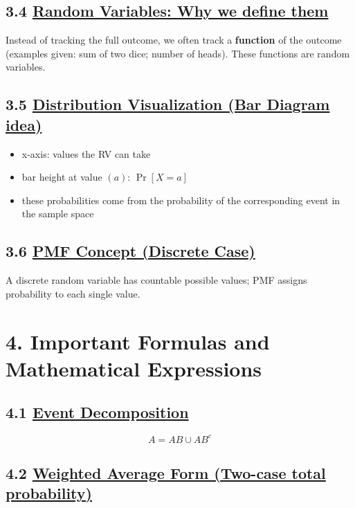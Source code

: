 \documentclass[11pt]{article}
\begin{document}
\vspace{0.5cm}
\subsection*{3.4 \underline{Random Variables: Why we define them}}

Instead of tracking the full outcome, we often track a \textbf{function} of the outcome (examples given: sum of two dice; number of heads). These functions are random variables.

\vspace{0.5cm}
\subsection*{3.5 \underline{Distribution Visualization (Bar Diagram idea)}}

\begin{itemize}
\item x-axis: values the RV can take
\item bar height at value $(a)$: $\Pr[X=a]$
\item these probabilities come from the probability of the corresponding event in the sample space
\end{itemize}

\vspace{0.5cm}
\subsection*{3.6 \underline{PMF Concept (Discrete Case)}}

A discrete random variable has countable possible values; PMF assigns probability to each single value.

\vspace{1cm}
\section*{4. Important Formulas and Mathematical Expressions}

\vspace{0.5cm}
\subsection*{4.1 \underline{Event Decomposition}}

\[
A = AB \cup AB^c
\]

\vspace{0.5cm}
\subsection*{4.2 \underline{Weighted Average Form (Two-case total probability)}}
\end{document}

